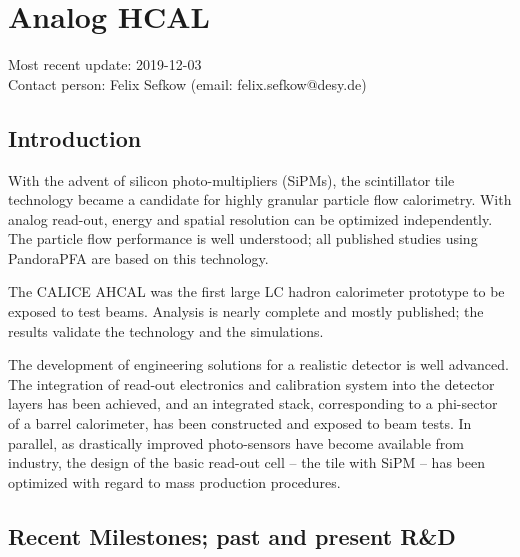 \section{Analog HCAL}
Most recent update: 2019-12-03\\
Contact person: Felix Sefkow (email: felix.sefkow@desy.de)
\subsection{Introduction}
With the advent of silicon photo-multipliers (SiPMs), the scintillator tile technology became a candidate for highly granular particle flow calorimetry. With analog read-out, energy and spatial resolution can be optimized independently. The particle flow performance is well understood; all published studies using PandoraPFA are based on this technology.

The CALICE AHCAL was the first large LC hadron calorimeter prototype to be exposed to test beams. Analysis is nearly complete and mostly published; the results validate the technology and the simulations.

The development of engineering solutions for a realistic detector is well advanced. The integration of read-out electronics and calibration system into the detector layers has been achieved, and an integrated stack, corresponding to a phi-sector of a barrel calorimeter, has been constructed and exposed to beam tests. In parallel, as drastically improved photo-sensors have become available from industry, the design of the basic read-out cell -- the tile with SiPM -- has been optimized with regard to mass production procedures.

\subsection{Recent Milestones; past and present R\&D}
